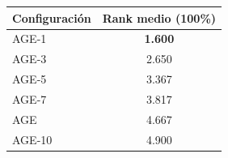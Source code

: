 \begin{tabular}{lc}
\toprule
\textbf{Configuración} & \textbf{Rank medio (100\%)} \\
\midrule
AGE-1 & \textbf{1.600} \\
AGE-3 & 2.650 \\
AGE-5 & 3.367 \\
AGE-7 & 3.817 \\
AGE & 4.667 \\
AGE-10 & 4.900 \\
\bottomrule
\end{tabular}

